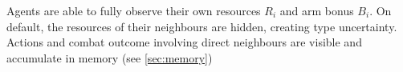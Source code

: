 Agents are able to fully observe their own resources $R_i$ and arm bonus $B_i$. On default, the resources of their neighbours are hidden, creating type uncertainty. %
Actions and combat outcome involving direct neighbours are visible and accumulate in memory (see \ref{sec:memory})


